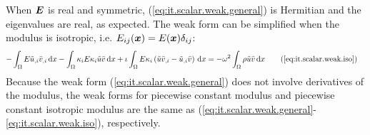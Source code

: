 %
When $\boldsymbol{E}$ is real and symmetric, (\ref{eq:it.scalar.weak.general}) is Hermitian and the eigenvalues are real, as expected. The weak form can be simplified when the modulus is isotropic, i.e. \(E_{ij}(\boldsymbol{x}) = E(\boldsymbol{x}) \delta_{ij}\):
%
\begin{align*}
    - \int_{\Omega} {
        E \kernel{u}_{,i} \bar{v}_{,i} \dx
    } - \int_{\Omega} {
        \wavenum_{i} E \wavenum_{i} \kernel{u} \bar{v} \dx
    } + \imag \int_{\Omega} {
        E \wavenum_{i} \left(
            \kernel{u} \bar{v}_{,i} - \kernel{u}_{,i} \bar{v}
        \right) \dx
    } &=
    -\omega^2 \int_{\Omega} { \rho \kernel{u} \bar{v} \dx }
    \tag{\ref{eq:it.scalar.weak.iso}}
\end{align*}
Because the weak form (\ref{eq:it.scalar.weak.general}) does not involve derivatives of the modulus, the weak forms for piecewise constant modulus and piecewise constant isotropic modulus are the same as (\ref{eq:it.scalar.weak.general}-\ref{eq:it.scalar.weak.iso}), respectively.

